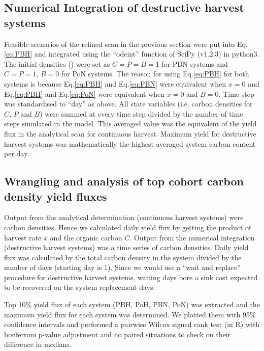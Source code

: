 \documentclass[../thesis.tex]{subfiles} %
\begin{document}
\subsection{Numerical Integration of destructive harvest systems}
Feasible scenarios of the refined scan in the previous section were put into Eq.\ref{eq:PBH} and integrated using the ``odeint” function of SciPy (v1.2.3) in python3.  The initial densities (\den) were set as $C=P=B=1$ for PBN systems and $C=P=1$, $B=0$ for PoN systems.  The reason for using Eq.\ref{eq:PBH} for both systems is because Eq.\ref{eq:PBH} and Eq.\ref{eq:PBN} were equivalent when $x=0$ and Eq.\ref{eq:PBH} and Eq.\ref{eq:PoN} were equivalent when $x=0$ and $B=0$.  Time step was standardised to ``day” as above.  All state variables (i.e. carbon densities for $C$, $P$ and $B$) were summed at every time step divided by the number of time steps simulated in the model.  This averaged value was the equivalent of the yield flux in the analytical scan for continuous harvest.  Maximum yield for destructive harvest systems was mathematically the highest averaged system carbon content per day.

\subsection{Wrangling and analysis of top cohort carbon density yield fluxes}
Output from the analytical determination (continuous harvest systems) were carbon densities.  Hence we calculated daily yield flux by getting the product of harvest rate $x$ and the organic carbon $C$.  Output from the numerical integration (destructive harvest systems) was a time series of carbon densities.  Daily yield flux was calculated by the total carbon density in the system divided by the number of days (starting day is 1).  Since we would use a “wait and replace” procedure for destructive harvest systems, waiting days bore a sink cost expected to be recovered on the system replacement days.

Top 10\% yield flux of each system (PBH, PoH, PBN, PoN) was extracted and the maximum yield flux for each system was determined.  We plotted them with 95\% confidence intervals and performed a pairwise Wilcox signed rank test (in R) with bonferroni p-value adjustment and no paired situations to check on their difference in medians.
\end{document}
